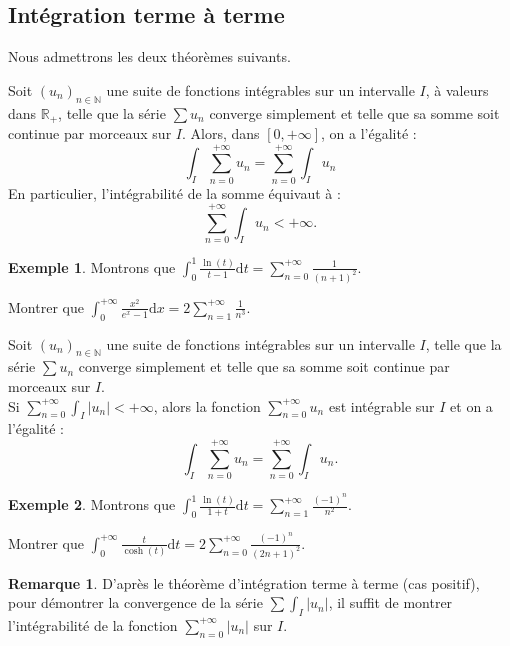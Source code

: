 \documentclass[french]{article}
\newcommand{\N}{\mathbb{N}}
\newcommand{\R}{\mathbb{R}}
\renewcommand{\d}{\text{d}}
\theoremstyle{plain}
\theoremstyle{definition}
\newtheorem*{ex}{Exemple}
\newtheorem*{rmq}{Remarque}
\theoremstyle{remark}
\begin{document}
\subsection{Intégration terme à terme}

Nous admettrons les deux théorèmes suivants.

\begin{thm}
	Soit $(u_n)_{n\in\N}$ une suite de fonctions intégrables sur un intervalle $I$, à valeurs dans $\R_+$, telle que la série $\sum u_n$ converge simplement et telle que sa somme soit continue par morceaux sur $I$. Alors, dans $[0,+\infty]$, on a l'égalité : $$\int_I\sum_{n=0}^{+\infty}u_n=\sum_{n=0}^{+\infty}\int_I u_n$$ En particulier, l'intégrabilité de la somme équivaut à : $$\sum_{n=0}^{+\infty}\int_I u_n<+\infty.$$
\end{thm}

\begin{ex}
	Montrons que $\displaystyle\int_{0}^{1}\frac{\ln(t)}{t-1}\d t=\sum_{n=0}^{+\infty}\frac{1}{(n+1)^2}$.
\end{ex}

\begin{exo}
	Montrer que $\displaystyle\int_{0}^{+\infty}\frac{x^2}{e^x-1}\d x=2\sum_{n=1}^{+\infty}\frac{1}{n^3}$.
\end{exo}

\begin{thm}
	Soit $(u_n)_{n\in\N}$ une suite de fonctions intégrables sur un intervalle $I$, telle que la série $\sum u_n$ converge simplement et telle que sa somme soit continue par morceaux sur $I$.\\ Si $\displaystyle\sum_{n=0}^{+\infty}\int_I\lvert u_n\rvert<+\infty$, alors la fonction $\displaystyle\sum_{n=0}^{+\infty}u_n$ est intégrable sur $I$ et on a l'égalité : $$\int_I\sum_{n=0}^{+\infty}u_n=\sum_{n=0}^{+\infty}\int_I u_n.$$
\end{thm}

\begin{ex}
	Montrons que $\displaystyle\int_{0}^{1}\frac{\ln(t)}{1+t}\d t=\sum_{n=1}^{+\infty}\frac{(-1)^n}{n^2}$.
\end{ex}

\begin{exo}
	Montrer que $\displaystyle\int_{0}^{+\infty}\frac{t}{\cosh(t)}\d t=2\sum_{n=0}^{+\infty}\frac{(-1)^n}{(2n+1)^2}$.
\end{exo}

\begin{rmq}
	D'après le théorème d'intégration terme à terme (cas positif), pour démontrer la convergence de la série $\displaystyle\sum\int_I\lvert u_n\rvert$, il suffit de montrer l'intégrabilité de la fonction $\displaystyle\sum_{n=0}^{+\infty}\lvert u_n\rvert$ sur $I$.
\end{rmq}
\end{document}
